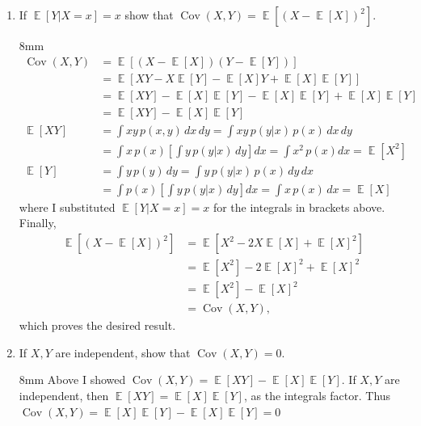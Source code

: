 \documentclass{article}
\DeclareMathOperator{\E}{\mathbb{E}}
\DeclareMathOperator{\cov}{Cov}
\newenvironment{solution}{\begin{adjustwidth}{8mm}{}}{\end{adjustwidth}}
\begin{document}
\begin{enumerate}
        \item If $\E[Y|X=x]=x$ show that $\cov(X,Y) = \E[(X-\E[X])^2]$.
        \begin{solution}
                \vspace{-5mm}
                \begin{align*}
                        \cov(X,Y) 
                        &= \E[(X - \E[X])(Y- \E[Y])] \\
                        &= \E[XY - X\E[Y] - \E[X]Y + \E[X]\E[Y]] \\
                        &= \E[XY] - \E[X]\E[Y] - \E[X]\E[Y] + \E[X]\E[Y] \\
                        &= \E[XY] - \E[X]\E[Y] \\
                        \E[XY]
                        &= \int x y \, p(x,y) \, dx \, dy
                         = \int x y \, p(y|x) \, p(x) \, dx \, dy \\
                        &= \int x \, p(x) \left[ \int y \, p(y|x) \, dy \right] dx
                         = \int x^2 \, p(x) dx = \E[X^2] \\
                        \E[Y]
                        &= \int y \, p(y) \, dy 
                         = \int y \, p(y|x) \, p(x) \, dy \, dx \\
                        &= \int p(x) \left[ \int y \, p(y|x) \, dy \right] dx 
                         = \int x \, p(x) \, dx = \E[X]
                \end{align*}
                where I substituted $\E[Y|X=x]=x$ for the integrals in brackets above.
                Finally,
                \begin{align*}
                        \E[(X - \E[X])^2] 
                        &= \E[X^2 - 2X\E[X] + \E[X]^2] \\
                        &= \E[X^2] - 2\E[X]^2 + \E[X]^2 \\
                        &= \E[X^2] - \E[X]^2 \\
                        &= \cov(X,Y),
                \end{align*}
                which proves the desired result.
        \end{solution}
        \item If $X,Y$ are independent, show that $\cov(X,Y) = 0$.
        \begin{solution}
                Above I showed $\cov(X,Y) = \E[XY] - \E[X]\E[Y]$. 
                If $X,Y$ are independent, then $\E[XY] = \E[X]\E[Y]$, as the integrals factor.
                Thus $\cov(X,Y) = \E[X]\E[Y] - \E[X]\E[Y] = 0$
        \end{solution}
\end{enumerate}
\end{document}
